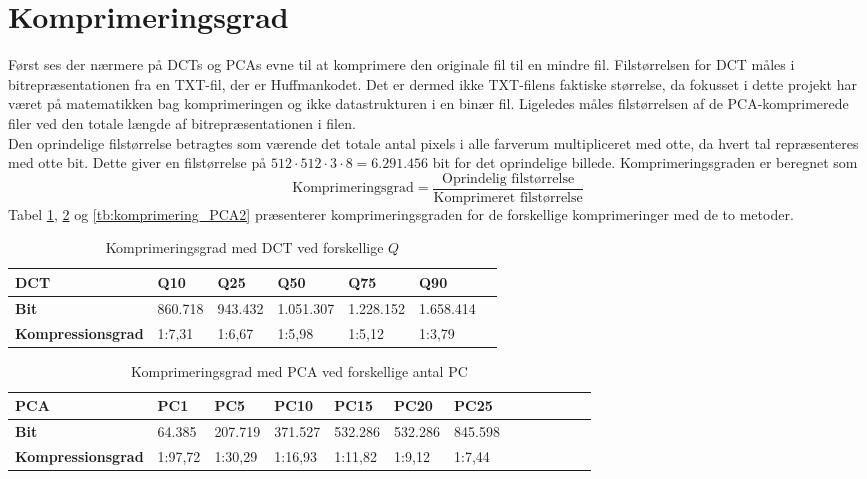 \section{Komprimeringsgrad}
Først ses der nærmere på DCTs og PCAs evne til at komprimere den originale fil til en mindre fil. Filstørrelsen for DCT måles i bitrepræsentationen fra en TXT-fil, der er Huffmankodet. Det er dermed ikke TXT-filens faktiske størrelse, da fokusset i dette projekt har været på matematikken bag komprimeringen og ikke datastrukturen i en binær fil. Ligeledes måles filstørrelsen af de PCA-komprimerede filer ved den totale længde af bitrepræsentationen i filen. \\
Den oprindelige filstørrelse betragtes som værende det totale antal pixels i alle farverum multipliceret med otte, da hvert tal repræsenteres med otte bit. Dette giver en filstørrelse på $512\cdot512\cdot3\cdot8 = 6.291.456$ bit for det oprindelige billede. Komprimeringsgraden er beregnet som $$\text{Komprimeringsgrad} = \frac{\text{Oprindelig filstørrelse}}{\text{Komprimeret filstørrelse}}$$
Tabel \ref{tb:komprimering_DCT}, \ref{tb:komprimering_PCA1} og \vref{tb:komprimering_PCA2} præsenterer komprimeringsgraden for de forskellige komprimeringer med de to metoder.
\begin{table}[htbp]
\centering
\begin{tabular}{|l|l|l|l|l|l|l|}	\hline
\textbf{DCT}					& \textbf{Q10}		& \textbf{Q25}		& \textbf{Q50}			& \textbf{Q75}			& \textbf{Q90}		\\ \hline
\textbf{Bit}					& 860.718	& 943.432	& 1.051.307		& 1.228.152		& 1.658.414	\\ \hline
\textbf{Kompressionsgrad}	& 1:7,31		& 1:6,67		& 1:5,98			& 1:5,12			& 1:3,79		\\ \hline
\end{tabular}
\caption{Komprimeringsgrad med DCT ved forskellige $Q$}
\label{tb:komprimering_DCT}
\end{table}
\begin{table}[htbp]
\centering
\begin{tabular}{|l|l|l|l|l|l|l|l|l|l|l|l|l|}	\hline
\textbf{PCA} 				& \textbf{PC1}  		& \textbf{PC5}		& \textbf{PC10}		& \textbf{PC15}		& \textbf{PC20}		& \textbf{PC25}		\\ \hline
\textbf{Bit}  			& 64.385 	& 207.719	& 371.527	& 532.286	& 532.286	& 845.598	\\ \hline
\textbf{Kompressionsgrad}	& 1:97,72	& 1:30,29	& 1:16,93	& 1:11,82	& 1:9,12 	& 1:7,44	\\ \hline
\end{tabular}
\caption{Komprimeringsgrad med PCA ved forskellige antal PC}
\label{tb:komprimering_PCA1}
\end{table}
